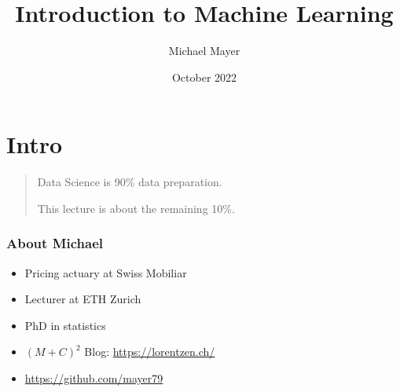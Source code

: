 \documentclass[
    utf8,
    aspectratio=169
]{beamer}  %
\title{Introduction to Machine Learning}
\author{Michael Mayer}
\date{October 2022}
\begin{document}

\frame{\titlepage}


\section{Intro}

\begin{frame}
\begin{quotation}
	\begin{huge}
		\begin{center}
			Data Science is 90\% data preparation.
	
			This lecture is about the remaining 10\%.
		\end{center}
	\end{huge}
\end{quotation}
\end{frame}

\begin{frame}
	\frametitle{About Michael}
	\begin{itemize}
		\item Pricing actuary at Swiss Mobiliar
		\item Lecturer at ETH Zurich
		\item PhD in statistics
		\item $(M+C)^2$ Blog: \url{https://lorentzen.ch/}
		\item \url{https://github.com/mayer79}
	\end{itemize}
\end{frame}
\end{document}
